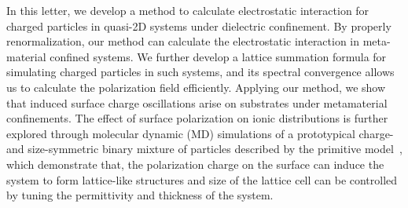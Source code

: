 \documentclass[aps,prl,reprint,showpacs,floatfix,superscriptaddress]{revtex4-2}
\begin{document}
In this letter, we develop a method to calculate electrostatic interaction for charged particles in quasi-2D systems under dielectric confinement.
By properly renormalization, our method can calculate the electrostatic interaction in meta-material confined systems.
We further develop a lattice summation formula for simulating charged particles in such systems, and its spectral convergence allows us to calculate the polarization field efficiently. 
Applying our method, we show that induced surface charge oscillations arise on substrates under metamaterial confinements.
The effect of surface polarization on ionic distributions is further explored through molecular dynamic (MD) simulations of a prototypical charge- and size-symmetric binary mixture of particles described by the primitive model~\cite{mcmillan1945statistical}, which demonstrate that, the polarization charge on the surface can induce the system to form lattice-like structures and size of the lattice cell can be controlled by tuning the permittivity and thickness of the system.


\end{document}
